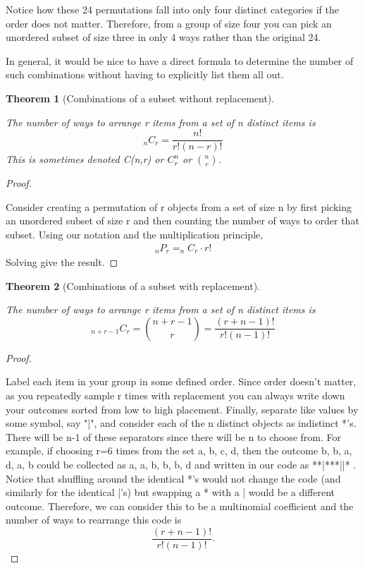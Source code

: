 \documentclass[10pt,]{book}
\theoremstyle{plain}
\newtheorem{theorem}{Theorem}[section]
\theoremstyle{definition}
\theoremstyle{definition}
\theoremstyle{definition}
\numberwithin{equation}{section}
\begin{document}
Notice how these 24 permutations fall into only four distinct categories if the order does not matter. Therefore, from a group of size four you can pick an unordered subset of size three in only 4 ways rather than the original 24.
%
\par

In general, it would be nice to have a direct formula to determine the number of such combinations without having to explicitly list them all out.
%
\begin{theorem}[{Combinations of a subset without replacement}]\label{theorem-9}

			The number of ways to arrange r items from a set of n distinct items 
			is 
			\begin{equation*} _nC_r = \frac{n!}{r!(n-r)!} \end{equation*}
			This is sometimes denoted C(n,r) or \(C_r^n\) or \({n \choose r}\).
\end{theorem}
\begin{proof}\hypertarget{proof-8}{}

			Consider creating a permutation of r objects from a set of size n
			by first picking an unordered subset of size r and then counting 
			the number of ways to order that subset. Using our notation and the
			multiplication principle,
			\begin{gather*}
_nP_r =  _nC_r \cdot r!
\end{gather*}
			Solving give the result.
\end{proof}
\begin{theorem}[{Combinations of a subset with replacement}]\label{theorem-10}

			The number of ways to arrange r items from a set of n distinct items 
			is 
			\begin{equation*} _{n+r-1}C_r = {{n+r-1} \choose r} = \frac{(r+n-1)!}{r!(n-1)!} \end{equation*}
\end{theorem}
\begin{proof}\hypertarget{proof-9}{}

			Label each item in your group in some defined order. Since order doesn't matter, as you repeatedly sample r times with replacement you can always write down your outcomes sorted from low to high placement. Finally, separate like values by some symbol, say "|", and consider each of the n distinct objects as indistinct *'s. There will be n-1 of these separators since there will be n to choose from. For example, if choosing r=6 times from the set {a, b, c, d}, then the outcome b, b, a, d, a, b could be collected as a, a, b, b, b, d and written in our code as **|***||* .  Notice that shuffling around the identical *'s would not change the code (and similarly for the identical |'s) but swapping a * with a | would be a different outcome. Therefore, we can consider this to be a multinomial coefficient and the number of ways to rearrange this code is
			\begin{equation*}\frac{(r + n-1)!}{r!(n-1)!}.\end{equation*}
\end{proof}
\end{document}
